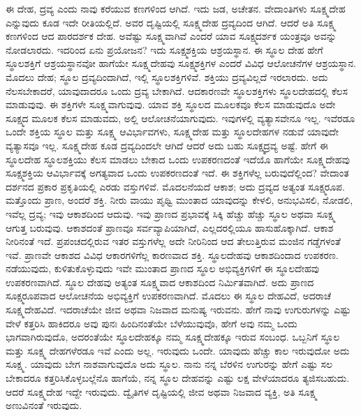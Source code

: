 ಈ ದೇಹ, ದ್ರವ್ಯ ಎಂದು ನಾವು ಕರೆಯುವ ಕಣಗಳಿಂದ ಆಗಿದೆ. ಇದು ಜಡ, ಅಚೇತನ. ವೇದಾಂತಿಗಳು ಸೂಕ್ಷ್ಮದೇಹ ಎನ್ನುವುದು ಕೂಡ ಇದೇ ರೀತಿಯಲ್ಲಿದೆ. ಅವರ ದೃಷ್ಟಿಯಲ್ಲಿ ಸೂಕ್ಷ್ಮದೇಹ ದ್ರವ್ಯದಿಂದ ಆಗಿದೆ. ಆದರೆ ಅತಿ ಸೂಕ್ಷ್ಮ ಕಣಗಳಿಂದ ಆದ ಪಾರದರ್ಶಕ ದೇಹ. ಅವೆಷ್ಟು ಸೂಕ್ಷ್ಮವಾಗಿವೆ ಎಂದರೆ ಯಾವ ಸೂಕ್ಷ್ಮದರ್ಶಕ ಯಂತ್ರವೂ ಅವನ್ನು ನೋಡಲಾರದು. ಇದರಿಂದ ಏನು ಪ್ರಯೋಜನ? ಇದು ಸೂಕ್ಷ್ಮಶಕ್ತಿಯ ಆಶ್ರಯಸ್ಥಾನ. ಈ ಸ್ಥೂಲ ದೇಹ ಹೇಗೆ ಸ್ಥೂಲಶಕ್ತಿಗೆ ಆಶ್ರಯಸ್ಥಾನವೋ ಹಾಗೆಯೇ ಸೂಕ್ಷ್ಮದೇಹವು ಸೂಕ್ಷ್ಮಶಕ್ತಿಗಳ ಎಂದರೆ ವಿವಿಧ ಆಲೋಚನೆಗಳ ಆಶ್ರಯಸ್ಥಾನ. ಮೊದಲು ದೇಹ; ಸ್ಥೂಲ ದ್ರವ್ಯದಿಂದಾಗಿದೆ, ಇಲ್ಲಿ ಸ್ಥೂಲಶಕ್ತಿಗಳಿವೆ. ಶಕ್ತಿಯು ದ್ರವ್ಯವಿಲ್ಲದೆ ಇರಲಾರದು. ಅದು ನೆಲಸಬೇಕಾದರೆ, ಯಾವುದಾದರೂ ಒಂದು ದ್ರವ್ಯ ಬೇಕಾಗಿದೆ. ಆದಕಾರಣವೇ ಸ್ಥೂಲಶಕ್ತಿಗಳು ಸ್ಥೂಲದೇಹದಲ್ಲಿ ಕೆಲಸ ಮಾಡುವುವು. ಈ ಶಕ್ತಿಗಳೇ ಸೂಕ್ಷ್ಮವಾಗುವುವು. ಯಾವ ಶಕ್ತಿ ಸ್ಥೂಲದ ಮೂಲಕವೂ ಕೆಲಸ ಮಾಡುವುದೊ ಅದೇ ಸೂಕ್ಷ್ಮದ ಮೂಲಕ ಕೆಲಸ ಮಾಡುವದು, ಅಲ್ಲಿ ಆಲೋಚನೆಯಾಗುವುದು. ಇವುಗಳಲ್ಲಿ ವ್ಯತ್ಯಾಸವೇನೂ ಇಲ್ಲ. ಇವೆರಡೂ ಒಂದೇ ಶಕ್ತಿಯ ಸ್ಥೂಲ ಮತ್ತು ಸೂಕ್ಷ್ಮ ಆವಿರ್ಭಾವಗಳು, ಸೂಕ್ಷ್ಮದೇಹ ಮತ್ತು ಸ್ಥೂಲದೇಹಗಳ ನಡುವೆ ಯಾವುದೇ ವ್ಯತ್ಯಾಸವೂ ಇಲ್ಲ. ಸೂಕ್ಷ್ಮದೇಹ ಕೂಡ ದ್ರವ್ಯದಿಂದಲೇ ಆಗಿದೆ ಆದರೆ ಅದು ಬಹು ಸೂಕ್ಷ್ಮದ್ರವ್ಯ ಅಷ್ಟೆ. ಹೇಗೆ ಈ ಸ್ಥೂಲದೇಹ ಸ್ಥೂಲಶಕ್ತಿಯು ಕೆಲಸ ಮಾಡಲು ಬೇಕಾದ ಒಂದು ಉಪಕರಣದಂತೆ ಇದೆಯೊ ಹಾಗೆಯೇ ಸೂಕ್ಷ್ಮದೇಹವು ಸೂಕ್ಷ್ಮಶಕ್ತಿಯ ಆವಿರ್ಭಾವಕ್ಕೆ ಅಗತ್ಯವಾದ ಒಂದು ಉಪಕರಣದಂತೆ ಇದೆ. ಈ ಶಕ್ತಿಗಳೆಲ್ಲ ಬರುವುದೆಲ್ಲಿಂದ? ವೇದಾಂತ ದರ್ಶನದ ಪ್ರಕಾರ ಪ್ರಕೃತಿಯಲ್ಲಿ ಎರಡು ವಸ್ತುಗಳಿವೆ. ಮೊದಲನೆಯದೆ ಆಕಾಶ; ಅದು ದ್ರವ್ಯದ ಅತ್ಯಂತ ಸೂಕ್ಷ್ಮರೂಪ. ಮತ್ತೊಂದು ಪ್ರಾಣ, ಅಂದರೆ ಶಕ್ತಿ. ನೀರು ವಾಯು ಪೃಥ್ವಿ ಮುಂತಾದ ಯಾವುದನ್ನು ಕೇಳಲಿ, ಅನುಭವಿಸಲಿ, ನೋಡಲಿ, ಇವೆಲ್ಲ ದ್ರವ್ಯ; ಇವು ಆಕಾಶದಿಂದ ಆದುವು. ಇವು ಪ್ರಾಣದ ಪ್ರಭಾವಕ್ಕೆ ಸಿಕ್ಕಿ ಹೆಚ್ಚು ಹೆಚ್ಚು ಸ್ಥೂಲ ಅಥವಾ ಸೂಕ್ಷ್ಮ ಆಗುತ್ತ ಬರುವುವು. ಆಕಾಶದಂತೆ ಪ್ರಾಣವೂ ಸರ್ವವ್ಯಾಪಿಯಾಗಿದೆ, ಎಲ್ಲದರಲ್ಲಿಯೂ ಹಾಸುಹೊಕ್ಕಾಗಿದೆ. ಆಕಾಶ ನೀರಿನಂತೆ ಇದೆ. ಪ್ರಪಂಚದಲ್ಲಿರುವ ಇತರ ವಸ್ತುಗಳೆಲ್ಲ ಅದೇ ನೀರಿನಿಂದ ಆದ ತೇಲುತ್ತಿರುವ ಮಂಜಿನ ಗಡ್ಡೆಗಳಂತೆ ಇವೆ. ಪ್ರಾಣವೇ ಆಕಾಶದ ವಿವಿಧ ಆಕಾರಗಳಿಗೆಲ್ಲ ಕಾರಣವಾದ ಶಕ್ತಿ. ಸ್ಥೂಲದೇಹವು ಆಕಾಶದಿಂದಾದ ಉಪಕರಣ. ನಡೆಯುವುದು, ಕುಳಿತುಕೊಳ್ಳುವುದು ಇವೇ ಮುಂತಾದ ಪ್ರಾಣದ ಸ್ಥೂಲ ಅಭಿವ್ಯಕ್ತಿಗಳಿಗೆ ಈ ಸ್ಥೂಲದೇಹವು ಉಪಕರಣವಾಗಿದೆ. ಸ್ಥೂಲ ದೇಹವು ಅತ್ಯಂತ ಸೂಕ್ಷ್ಮವಾದ ಆಕಾಶದಿಂದ ನಿರ್ಮಿತವಾಗಿದೆ. ಅದು ಪ್ರಾಣದ ಸೂಕ್ಷ್ಮರೂಪವಾದ ಆಲೋಚನೆಯ ಅಭಿವ್ಯಕ್ತಿಗೆ ಉಪಕರಣವಾಗಿದೆ. ಮೊದಲು ಈ ಸ್ಥೂಲ ದೇಹವಿದೆ, ಅದರಾಚೆ ಸೂಕ್ಷ್ಮದೇಹವಿದೆ. ಇದರಾಚೆಯೇ ಜೀವ ಅಥವಾ ನಿಜವಾದ ಮನುಷ್ಯ ಇರುವನು. ಹೇಗೆ ನಾವು ಉಗುರುಗಳನ್ನು ಎಷ್ಟು ವೇಳೆ ಕತ್ತರಿಸಿ ಹಾಕಿದರೂ ಅವು ಪುನಃ ಹಿಂದಿನಂತೆಯೇ ಬೆಳೆಯುವುವೊ, ಹೇಗೆ ಅವು ನಮ್ಮ ಒಂದು ಭಾಗವಾಗಿರುವುದೊ, ಅದರಂತೆಯೇ ಸ್ಥೂಲದೇಹಕ್ಕೂ ನಮ್ಮ ಸೂಕ್ಷ್ಮದೇಹಕ್ಕೂ ಇರುವ ಸಂಬಂಧ. ಒಬ್ಬನಿಗೆ ಸ್ಥೂಲ ಮತ್ತು ಸೂಕ್ಷ್ಮ ದೇಹಗಳೆರಡೂ ಇವೆ ಎಂದು ಅಲ್ಲ. ಇರುವುದು ಒಂದೇ. ಯಾವುದು ಹೆಚ್ಚು ಕಾಲ ಇರುವುದೋ ಅದು ಸೂಕ್ಷ್ಮ. ಯಾವುದು ಬೇಗ ನಾಶವಾಗುವುದೊ ಅದು ಸ್ಥೂಲ. ನಾನು ನನ್ನ ಬೆರಳಿನ ಉಗುರನ್ನು ಹೇಗೆ ಎಷ್ಟು ಸಲ ಬೇಕಾದರೂ ಕತ್ತರಿಸಿಕೊಳ್ಳಬಲ್ಲೆನೊ ಹಾಗೆಯೆ, ನನ್ನ ಸ್ಥೂಲ ದೇಹವನ್ನು ಎಷ್ಟು ಲಕ್ಷ ವೇಳೆಯಾದರೂ ತ್ಯಜಿಸಬಹುದು. ಆದರೆ ಸೂಕ್ಷ್ಮದೇಹ ಇದ್ದೇ ಇರುವುದು. ದ್ವೈತಿಗಳ ದೃಷ್ಟಿಯಲ್ಲಿ ಜೀವ ಅಥವಾ ನಿಜವಾದ ವ್ಯಕ್ತಿ, ಅತಿ ಸೂಕ್ಷ್ಮ ಅಣುವಿನಂತೆ ಇರುವುದು.

